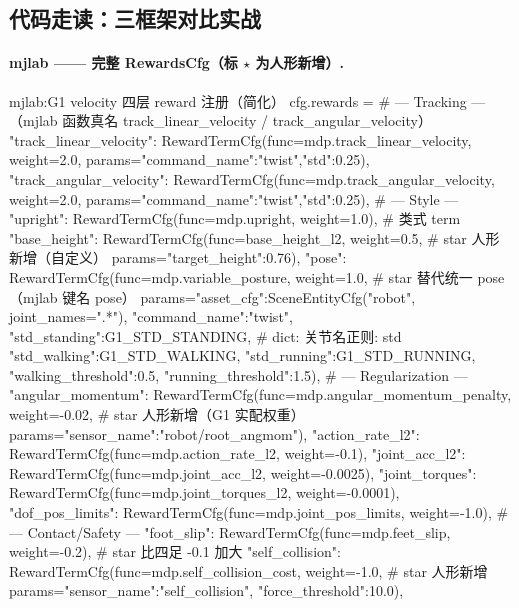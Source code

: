\subsection{代码走读：三框架对比实战}

\paragraph{mjlab —— 完整 RewardsCfg（标 $\star$ 为人形新增）.}

\begin{codebox}[Python]{mjlab:G1 velocity 四层 reward 注册（简化）}
cfg.rewards = {
    # --- Tracking ---（mjlab 函数真名 track_linear_velocity / track_angular_velocity）
    "track_linear_velocity":  RewardTermCfg(func=mdp.track_linear_velocity, weight=2.0,
                                            params={"command_name":"twist","std":0.25}),
    "track_angular_velocity": RewardTermCfg(func=mdp.track_angular_velocity, weight=2.0,
                                            params={"command_name":"twist","std":0.25}),
    # --- Style ---
    "upright":          RewardTermCfg(func=mdp.upright, weight=1.0),            # 类式 term
    "base_height":      RewardTermCfg(func=base_height_l2, weight=0.5,          # star 人形新增（自定义）
                                      params={"target_height":0.76}),
    "pose":             RewardTermCfg(func=mdp.variable_posture, weight=1.0,    # star 替代统一 pose（mjlab 键名 pose）
                                      params={"asset_cfg":SceneEntityCfg("robot", joint_names=".*"),
                                              "command_name":"twist",
                                              "std_standing":G1_STD_STANDING,   # dict: {关节名正则: std}
                                              "std_walking":G1_STD_WALKING,
                                              "std_running":G1_STD_RUNNING,
                                              "walking_threshold":0.5, "running_threshold":1.5}),
    # --- Regularization ---
    "angular_momentum": RewardTermCfg(func=mdp.angular_momentum_penalty, weight=-0.02,  # star 人形新增（G1 实配权重）
                                      params={"sensor_name":"robot/root_angmom"}),
    "action_rate_l2":   RewardTermCfg(func=mdp.action_rate_l2, weight=-0.1),
    "joint_acc_l2":     RewardTermCfg(func=mdp.joint_acc_l2,   weight=-0.0025),
    "joint_torques":    RewardTermCfg(func=mdp.joint_torques_l2, weight=-0.0001),
    "dof_pos_limits":   RewardTermCfg(func=mdp.joint_pos_limits, weight=-1.0),
    # --- Contact/Safety ---
    "foot_slip":        RewardTermCfg(func=mdp.feet_slip, weight=-0.2),         # star 比四足 -0.1 加大
    "self_collision":   RewardTermCfg(func=mdp.self_collision_cost, weight=-1.0,  # star 人形新增
                                      params={"sensor_name":"self_collision",
                                              "force_threshold":10.0}),
}
\end{codebox}

